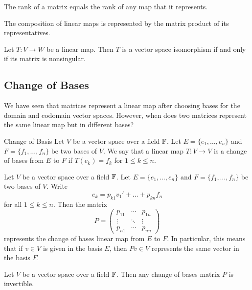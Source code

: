 \documentclass[a4paper]{article}
\begin{document}
\begin{thm}{}{} The rank of a matrix equals the rank of any map that it represents. 
\end{thm}

\begin{thm}{}{} The composition of linear maps is represented by the matrix product of its representatives. 
\end{thm}

\begin{thm}{}{} Let $T:V\to W$ be a linear map. Then $T$ is a vector space isomorphism if and only if its matrix is nonsingular. 
\end{thm}

\subsection{Change of Bases}
We have seen that matrices represent a linear map after choosing bases for the domain and codomain vector spaces. However, when does two matrices represent the same linear map but in different bases?

\begin{defn}{Change of Basis}{} Let $V$ be a vector space over a field $\mathbb{F}$. Let $E=\{e_1,\dots,e_n\}$ and $F=\{f_1,\dots,f_n\}$ be two bases of $V$. We say that a linear map $T:V\to V$ is a change of bases from $E$ to $F$ if $T(e_k)=f_k$ for $1\leq k\leq n$. 
\end{defn}

\begin{prp}{}{} Let $V$ be a vector space over a field $\mathbb{F}$. Let $E=\{e_1,\dots,e_n\}$ and $F=\{f_1,\dots,f_n\}$ be two bases of $V$. Write $$e_k=p_{k1}v_1'+\dots+p_{kn}f_n$$ for all $1\leq k\leq n$. Then the matrix $$P=\begin{pmatrix}
p_{11}&\cdots&p_{1n}\\
\vdots&\ddots&\vdots\\
p_{n1}&\cdots&p_{nn}
\end{pmatrix}$$ represents the change of bases linear map from $E$ to $F$. In particular, this means that if $v\in V$ is given in the basis $E$, then $Pv\in V$ represents the same vector in the basis $F$. 
\end{prp}

\begin{lmm}{}{} Let $V$ be a vector space over a field $\mathbb{F}$. Then any change of bases matrix $P$ is invertible. 
\end{lmm}
\end{document}

